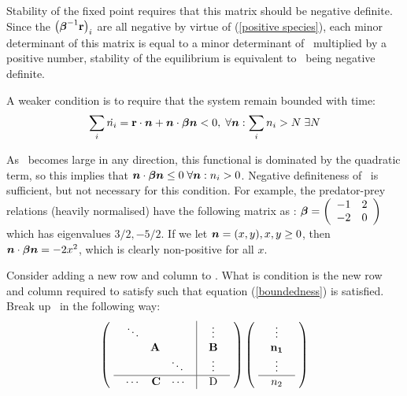 Stability of the fixed point requires that this matrix should be
negative definite. Since the $\left(\mbox{\boldmath{$\beta$}}^{-1}\mbox{${\bf r}$}\right)_i$ are
all negative by virtue of (\ref{positive species}), each minor
determinant of this matrix is equal to a minor determinant of \bbeta\
multiplied by a positive number, stability of the equilibrium is
equivalent to \bbeta\ being negative definite.

A weaker condition is to require that the system remain bounded with
time:
\begin{equation}\label{boundedness}
\sum_i\dot{n_i}=\mbox{${\bf r}$}\cdot\mbox{\boldmath{$n$}} + \mbox{\boldmath{$n$}}\cdot\mbox{\boldmath{$\beta$}}\mbox{\boldmath{$n$}} < 0, \;\forall \mbox{\boldmath{$n$}}:
\sum_in_i>N \;\exists N
\end{equation}

As \bn\ becomes large in any direction, this functional is dominated
by the quadratic term, so this implies that  $\mbox{\boldmath{$n$}}\cdot\mbox{\boldmath{$\beta$}}\mbox{\boldmath{$n$}}\leq0
\; \forall\mbox{\boldmath{$n$}}: n_i>0$. Negative definiteness of \bbeta\ is sufficient,
but not necessary for this condition. For example, the predator-prey
relations (heavily normalised) have the following matrix as \bbeta:
\begin{math}
\mbox{\boldmath{$\beta$}}=\left(\begin{array}{cc}
-1 & 2\\
-2 & 0\\
\end{array}\right)
\end{math}
which has eigenvalues $3/2, -5/2$. If we let $\mbox{\boldmath{$n$}}=(x,y), x,y\geq0$, then
$\mbox{\boldmath{$n$}}\cdot\mbox{\boldmath{$\beta$}}\mbox{\boldmath{$n$}}=-2x^2$, which is clearly non-positive
for all $x$.

Consider adding a new row and column to \bbeta. What is condition is
the new row and column required to satisfy such that equation
(\ref{boundedness}) is satisfied. Break up \bbeta\ in the following
way:
\begin{displaymath}
\left(
  \mbox{
     \begin{tabular}{c|c}
       $\begin{array}{ccc}\ddots\\&{\bf A}\\&&\ddots\end{array}$ & 
       $\begin{array}{c}\vdots\\{\bf B}\\\vdots\end{array}$ \\
       \hline
       $\begin{array}{ccc}\cdots&{\bf C}&\cdots\end{array}$ & D
     \end{tabular}
   }
\right)
\left(
  \mbox{
     \begin{tabular}{c}
     $\begin{array}{c}\vdots\\{\bf n_1}\\\vdots\end{array}$\\
     \hline
     $n_2$
     \end{tabular}
    }
\right)
\end{displaymath}

